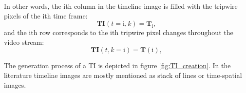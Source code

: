 In other words, the $\text{i}$th column in the timeline image is filled with the tripwire pixels of the $\text{i}$th time frame:
\begin{displaymath}
	\boldsymbol{TI}(t=\text{i},k)=\boldsymbol{T}_\text{i},
\end{displaymath}
and the $\text{i}$th row corresponds to the $\text{i}$th tripwire pixel changes throughout the video stream:
\begin{displaymath}
\boldsymbol{TI}(t,k=\text{i})=\boldsymbol{T}(\text{i}),
\end{displaymath}

The generation process of a TI is depicted in figure \ref{fig:TI_creation}.
In the literature timeline images are mostly mentioned as stack of lines or time-spatial images.
